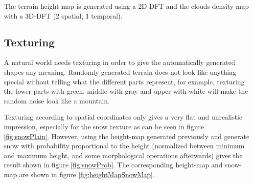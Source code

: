 \documentclass{article}
\begin{document}
The terrain height map is generated using a 2D-DFT and the clouds density map with a 3D-DFT (2 spatial, 1 temporal).

\subsection{Texturing} \label{sec:tex}
A natural world needs texturing in order to give the automatically generated shapes any meaning.
Randomly generated terrain does not look like anything special without telling what the different parts represent, for example, texturing the lower parts with green, middle with gray and upper with white will make the random noise look like a mountain.

Texturing according to spatial coordinates only gives a very flat and unrealistic impression, especially for the snow texture as can be seen in figure \ref{fig:snowPlain}. However, using the height-map generated previously and generate snow with probability proportional to the height (normalized between minimum and maximum height, and some morphological operations afterwards) gives the result shown in figure \ref{fig:snowProb}. The corresponding height-map and snow-map are shown in figure \ref{fig:heightMapSnowMap}.
\end{document}
